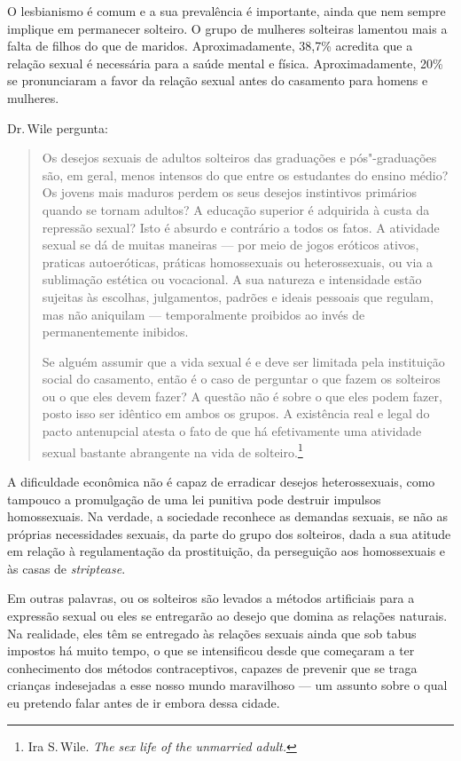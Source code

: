 O lesbianismo é comum e a sua prevalência é importante, ainda que nem
sempre implique em permanecer solteiro. O grupo de mulheres solteiras
lamentou mais a falta de filhos do que de maridos. Aproximadamente,
38,7\% acredita que a relação sexual é necessária para a saúde mental e
física. Aproximadamente, 20\% se pronunciaram a favor da relação sexual
antes do casamento para homens e mulheres.

Dr.\,Wile pergunta:

\begin{quote}
Os desejos sexuais de adultos solteiros das graduações e
pós"-graduações são, em
geral, menos intensos do que entre os estudantes do ensino médio? Os
jovens mais maduros perdem os seus desejos instintivos primários
quando se tornam adultos? A educação superior é adquirida à custa da
repressão sexual? Isto é absurdo e contrário a todos os fatos. A
atividade sexual se dá de muitas maneiras --- por meio de jogos eróticos
ativos, praticas autoeróticas, práticas homossexuais ou heterossexuais,
ou via a sublimação estética ou vocacional. A sua natureza e intensidade
estão sujeitas às escolhas, julgamentos, padrões e ideais pessoais que
regulam, mas não aniquilam --- temporalmente proibidos ao invés de
permanentemente inibidos.

Se alguém assumir que a vida sexual é e deve ser limitada pela
instituição social do casamento, então é o caso de perguntar o que fazem
os solteiros ou o que eles devem fazer? A questão não é sobre o que eles
podem fazer, posto isso ser idêntico em ambos os grupos. A existência
real e legal do pacto antenupcial atesta o fato de que há efetivamente
uma atividade sexual bastante abrangente na vida de
solteiro.\footnote{Ira S.\,Wile. \textit{The sex life of the unmarried
  adult.}}
\end{quote}


A dificuldade econômica não é capaz de erradicar desejos heterossexuais,
como tampouco a promulgação de uma lei punitiva pode destruir impulsos
homossexuais. Na verdade, a sociedade reconhece as demandas sexuais, se
não as próprias necessidades sexuais, da parte do grupo dos solteiros,
dada a sua atitude em relação à regulamentação da prostituição, da
perseguição aos homossexuais e às casas de \textit{striptease}.

Em outras palavras, ou os solteiros são levados a métodos artificiais
para a expressão sexual ou eles se entregarão ao desejo que domina as
relações naturais. Na realidade, eles têm se entregado às relações
sexuais ainda que sob tabus impostos há muito tempo, o que se intensificou desde que começaram a ter conhecimento dos
métodos contraceptivos, capazes de prevenir que se traga crianças
indesejadas a esse nosso mundo maravilhoso --- um assunto sobre o qual eu
pretendo falar antes de ir embora dessa cidade.

